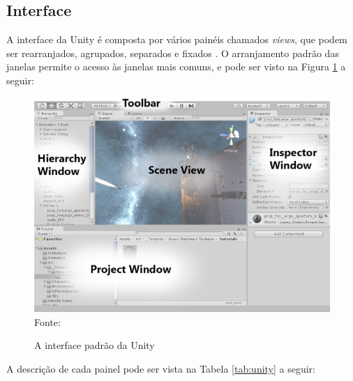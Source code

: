 \documentclass[
	12pt,					%
	openright,				%
	oneside,				%
	a4paper,				%
	bibjustif,				%
	chapter=TITLE,			%
	english,				%
	brazil,					%
	]{abntex2}
\newcommand{\source}[1]{\small Fonte: {#1}}
\begin{document}
		\FloatBarrier
		\subsection{Interface}
			A interface da Unity é composta por vários painéis chamados \textit{views},
			que podem ser rearranjados, agrupados, separados e fixados
			\cite{unityInterface}.
			O arranjamento padrão das janelas permite o acesso às janelas mais comuns,
			e pode ser visto na Figura \ref{fig:interfaceUnity} a seguir:
			
			\begin{figure}[ht!]
				\caption{A interface padrão da Unity}
				\centering
				\includegraphics[scale=0.5]{img/InterfaceUnity.jpg}\\
				\vspace{0.5mm}
				\source{}
				\label{fig:interfaceUnity}
			\end{figure}	
			
			A descrição de cada painel pode ser vista na Tabela \ref{tab:unity} a seguir:
			
\end{document}
